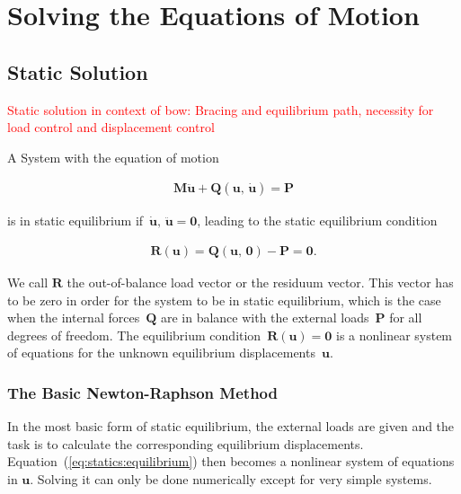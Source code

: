 
\chapter{Solving the Equations of Motion}

\section{Static Solution}

\textcolor{red}{Static solution in context of bow: Bracing and equilibrium path, necessity for load control and displacement control}

A System with the equation of motion

\begin{align}
\boldsymbol{M}\ddot{\boldsymbol{u}} + \boldsymbol{Q}(\boldsymbol{u},\,\dot{\boldsymbol{u}}) = \boldsymbol{P}
\end{align}

is in static equilibrium if~$\dot{\boldsymbol{u}},\,\ddot{\boldsymbol{u}} = \boldsymbol{0}$, leading to the static equilibrium condition

\begin{align}
\boldsymbol{R}(\boldsymbol{u}) = \boldsymbol{Q}(\boldsymbol{u},\,\boldsymbol{0}) - \boldsymbol{P} = \boldsymbol{0}. \label{eq:statics:equilibrium}
\end{align}

We call $\boldsymbol{R}$ the out-of-balance load vector or the residuum vector.
This vector has to be zero in order for the system to be in static equilibrium, which is the case when the internal forces~$\boldsymbol{Q}$ are in balance with the external loads~$\boldsymbol{P}$ for all degrees of freedom.
The equilibrium condition~$\boldsymbol{R}(\boldsymbol{u}) = \boldsymbol{0}$ is a nonlinear system of equations for the unknown equilibrium displacements~$\boldsymbol{u}$.


\subsection{The Basic Newton-Raphson Method}

In the most basic form of static equilibrium, the external loads are given and the task is to calculate the corresponding equilibrium displacements.
Equation~(\ref{eq:statics:equilibrium}) then becomes a nonlinear system of equations in $\boldsymbol{u}$.
Solving it can only be done numerically except for very simple systems.

